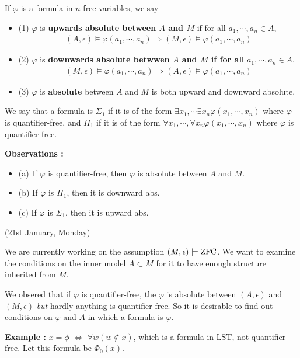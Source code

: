 \documentclass[12pt,a4paper]{article}
\renewenvironment{i}
{\begin{itemize} 
	}%
	{\end{itemize}
}
\begin{document}
 If $\varphi$ is a formula in $n$ free variables, we say
\begin{i}
\item[(1)] $\varphi$ is \textbf{upwards absolute between $A$ and $M$} if for all $a_1, \cdots, a_n \in A$,
\begin{align*}
(A, \epsilon) \models \varphi(a_1, \cdots, a_n) \Rightarrow (M, \epsilon) \models \varphi(a_1, \cdots, a_n)
\end{align*}
\item[(2)] $\varphi$ is \textbf{downwards absolute betwwen $A$ and $M$ if for all} $a_1, \cdots, a_n \in A$,
\begin{align*}
(M, \epsilon) \models \varphi(a_1, \cdots, a_n) \Rightarrow (A, \epsilon) \models \varphi(a_1, \cdots, a_n)
\end{align*}
\item[(3)] $\varphi$ is \textbf{absolute} between $A$ and $M$ is both upward and downward absolute. 
\end{i}
\s

 We say that a formula is $\Sigma_1$ if it is of the form $\exists x_1, \cdots \exists x_n \varphi(x_1, \cdots, x_n)$ where $\varphi$ is quantifier-free, and $\Pi_1$ if it is of the form $\forall x_1, \cdots, \forall x_n \varphi(x_1, \cdots, x_n)$ where $\varphi$ is quantifier-free.
\s

\textbf{Observations :} 
\begin{i}
\item[(a)] If $\varphi$ is quantifier-free, then $\varphi$ is absolute between $A$ and $M$.
\item[(b)] If $\varphi$ is $\Pi_1$, then it is downward abs.
\item[(c)] If $\varphi$ is $\Sigma_1$, then it is upward abs. 
\end{i}
\s

\newday

(21st January, Monday)
\s

We are currently working on the assumption $(M, \epsilon) \models \text{ZFC}$. We want to examine the conditions on the inner model $A\subset M$ for it to have enough structure inherited from $M$.

\quad We obsered that if $\varphi$ is quantifier-free, the $\varphi$ is absolute between $(A, \epsilon)$ and $(M, \epsilon)$ \emph{but} hardly anything is quantifier-free. So it is desirable to find out conditions on $\varphi$ and $A$ in which a formula is $\varphi$.
\s

\textbf{Example :} $x =\phi$ $\Leftrightarrow$ $\forall w(w \not\in x)$, which is a formula in LST, not quantifier free. Let this formula be $\Phi_0(x)$.
\end{document}
